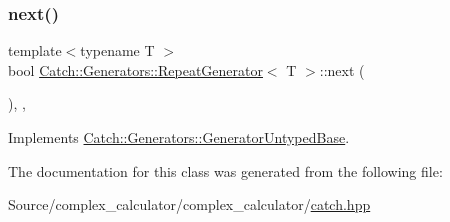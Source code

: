 \mbox{\label{class_catch_1_1_generators_1_1_repeat_generator_a24d5c2b1c09d6d220d4bd4c83f222dcb}} 
\subsubsection{\texorpdfstring{next()}{next()}}
{\footnotesize\ttfamily template$<$typename T $>$ \\
bool \mbox{\hyperlink{class_catch_1_1_generators_1_1_repeat_generator}{Catch\+::\+Generators\+::\+Repeat\+Generator}}$<$ T $>$\+::next (\begin{DoxyParamCaption}{ }\end{DoxyParamCaption})\hspace{0.3cm}{\ttfamily [inline]}, {\ttfamily [override]}, {\ttfamily [virtual]}}



Implements \mbox{\hyperlink{class_catch_1_1_generators_1_1_generator_untyped_base_aeed3c0cd6233c5f553549e453b8d6638}{Catch\+::\+Generators\+::\+Generator\+Untyped\+Base}}.



The documentation for this class was generated from the following file\+:\begin{DoxyCompactItemize}
\item 
Source/complex\+\_\+calculator/complex\+\_\+calculator/\mbox{\hyperlink{catch_8hpp}{catch.\+hpp}}\end{DoxyCompactItemize}
